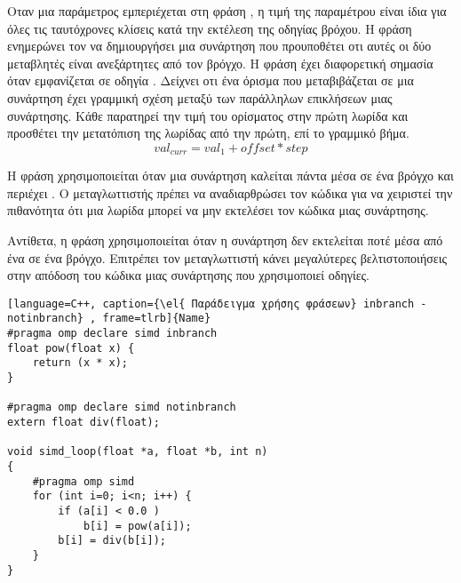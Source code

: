 Οταν μια παράμετρος εμπεριέχεται στη φράση \emph{}, η τιμή της παραμέτρου είναι ίδια για όλες τις
ταυτόχρονες κλίσεις κατά την εκτέλεση της οδηγίας \emph{} βρόχου. Η φράση \emph{}
ενημερώνει τον \emph{} να δημιουργήσει μια \emph{} συνάρτηση που προυποθέτει οτι αυτές οι δύο
μεταβλητές είναι ανεξάρτητες από τον βρόγχο. Η φράση \emph{} έχει διαφορετική σημασία όταν εμφανίζεται σε
οδηγία \emph{}. Δείχνει οτι ένα όρισμα που μεταβιβάζεται σε μια συνάρτηση έχει γραμμική σχέση μεταξύ των
παράλληλων επικλήσεων μιας συνάρτησης. Κάθε \emph{} παρατηρεί την τιμή του ορίσματος στην πρώτη λωρίδα και
προσθέτει την μετατόπιση της \emph{} λωρίδας από την πρώτη, επί το γραμμικό βήμα.
$$val_{curr} = val_1 + offset * step $$

Η φράση \emph{} χρησιμοποιείται όταν μια συνάρτηση καλείται πάντα μέσα σε ένα βρόγχο \emph{} και
περιέχει \emph{}. Ο μεταγλωττιστής πρέπει να αναδιαρθρώσει τον κώδικα για να χειριστεί την πιθανότητα
ότι μια λωρίδα \emph{} μπορεί να μην εκτελέσει τον κώδικα μιας συνάρτησης.

Αντίθετα, η φράση \emph{} χρησιμοποιείται όταν η συνάρτηση δεν εκτελείται ποτέ μέσα από ένα \emph{} σε ένα \emph{} βρόγχο. Επιτρέπει τον μεταγλωττιστή κάνει μεγαλύτερες βελτιστοποιήσεις στην απόδοση
του κώδικα μιας συνάρτησης που χρησιμοποιεί \emph{} οδηγίες.

\clearpage
{}
\begin{lstlisting}[language=C++, caption={\el{ Παράδειγμα χρήσης φράσεων} inbranch - notinbranch} , frame=tlrb]{Name}
#pragma omp declare simd inbranch
float pow(float x) {
	return (x * x);
}

#pragma omp declare simd notinbranch
extern float div(float);

void simd_loop(float *a, float *b, int n)
{
	#pragma omp simd
	for (int i=0; i<n; i++) {
		if (a[i] < 0.0 )
			b[i] = pow(a[i]);
		b[i] = div(b[i]);
	}
}
\end{lstlisting}
